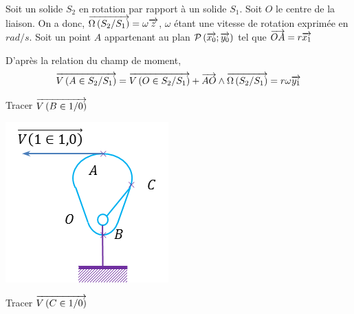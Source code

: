 \documentclass[11pt,oneside]{article}
\begin{document}
\begin{resultat}
Soit un solide $S_2$ en rotation par rapport à un solide $S_1$. Soit $O$ le centre de la liaison. On a donc, $\overrightarrow{\Omega\left( {S_2}/{S_1}\right)}=\omega\overrightarrow{z}$, $\omega$ étant une vitesse de rotation exprimée en $rad/s$. 
Soit un point $A$ appartenant au plan $\mathcal{P}\left(\overrightarrow{x_0};\overrightarrow{y_0}\right)$ tel que $\overrightarrow{OA} = r\overrightarrow{x_1}$

D'après la relation du champ de moment, 
$$
\overrightarrow{V\left( {A} \in {S_2}/{S_1}\right)}=\overrightarrow{V\left( {O} \in {S_2}/{S_1}\right)}+\overrightarrow{AO}\wedge\overrightarrow{\Omega\left( {S_2}/{S_1}\right)}=r\omega\overrightarrow{y_1}
$$
\end{resultat}
\begin{exemple}
\begin{minipage}[c]{.3\linewidth}
Tracer $\overrightarrow{V\left( {B} \in {1}/{0}\right)}$
\begin{center}
\includegraphics[width=\textwidth]{png/came}
\end{center}
\end{minipage}\hfill
\begin{minipage}[c]{.3\linewidth}
\begin{center}
Tracer $\overrightarrow{V\left( {C} \in {1}/{0}\right)}$

\end{center}
\end{minipage}
\end{exemple}
\end{document}
